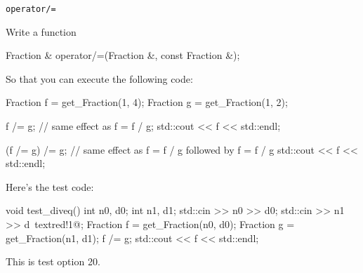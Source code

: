 \verb!operator/=!

Write a function
\begin{console}[commandchars=\\\{\}]
Fraction & operator/=(Fraction &, const Fraction &);
\end{console}

So that you can execute the following code:
\begin{console}
Fraction f = get_Fraction(1, 4);
Fraction g = get_Fraction(1, 2);

f /= g; // same effect as f = f / g;
std::cout << f << std::endl;

(f /= g) /= g; // same effect as f = f / g followed by f = f / g
std::cout << f << std::endl;
\end{console}

Here's the test code:
\begin{console}[commandchars=\~\!\@]
void test_diveq()
{
    int n0, d0; 
    int n1, d1;
    std::cin >> n0 >> d0;
    std::cin >> n1 >> d~textred!1@;
    Fraction f = get_Fraction(n0, d0);
    Fraction g = get_Fraction(n1, d1);
    f /= g;
    std::cout << f << std::endl;
}
\end{console}
This is test option 20.
